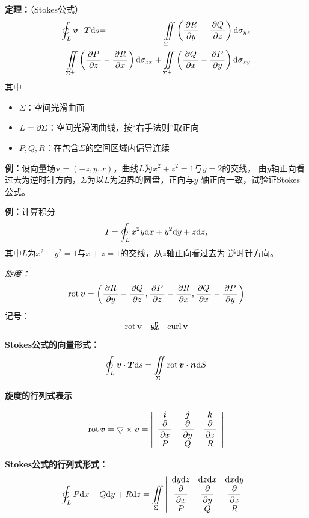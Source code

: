 {\bf 定理：}（Stokes公式）
\begin{eqnarray*}
	{\ds\oint_L\bm{v}\cdot\bm{T}\d s}&{=}&
	{\ds\iint\limits_{\Sigma^+}\left(\df{\p R}{\p y}-\df{\p Q}{\p
	z}\right)\d\sigma_{yz}}\\ 
	&& {\hspace{-2cm}\ds\iint\limits_{\Sigma^+}\left(\df{\p P}{\p
	z}-\df{\p R}{\p x}\right)\d\sigma_{zx}
	+\iint\limits_{\Sigma^+}\left(\df{\p Q}{\p x}-\df{\p P}{\p
	y}\right)\d\sigma_{xy}}
\end{eqnarray*}
其中
\begin{itemize}
  \item {$\Sigma$：}空间光滑曲面
  \item {$L=\partial\Sigma$：}空间光滑闭曲线，按{“右手法则”}取正向
  \item {$P,Q,R$：}在包含$\Sigma$的空间区域内偏导连续
\end{itemize}

{\bf 例：}设向量场$\bm{v}=(-z,y,x)$，曲线$L$为$x^2+z^2=1$与$y=2$的交线，
由$y$轴正向看过去为逆时针方向，$\Sigma$为以$L$为边界的圆盘，正向与$y$
轴正向一致，试验证Stokes公式。

{\bf 例：}计算积分
$$I=\oint_Lx^2y\mathrm{d} x+y^2\mathrm{d} y+z\mathrm{d} z,$$
其中$L$为$x^2+y^2=1$与$x+z=1$的交线，从$z$轴正向看过去为
逆时针方向。

{\it 旋度：}
$${\mathrm{rot}\,\bm{v}=\left(
\displaystyle\frac{\,{\partial R}\,}{\,{\partial y}\,}-\displaystyle\frac{\,{\partial Q}\,}{\,{\partial z}\,},
\displaystyle\frac{\,{\partial P}\,}{\,{\partial z}\,}-\displaystyle\frac{\,{\partial R}\,}{\,{\partial x}\,},
\displaystyle\frac{\,{\partial Q}\,}{\,{\partial x}\,}-\displaystyle\frac{\,{\partial P}\,}{\,{\partial y}\,}
\right)}$$ 
{记号：}
$$\mathrm{rot}\,\bm{v}\quad \mbox{或}\quad\mathrm{curl}\,\bm{v}$$ 

{\bf Stokes公式的向量形式：}
$${\oint_L\bm{v}\cdot\bm{T}\mathrm{d} s
=\iint\limits_{\Sigma}\mathrm{rot}\,\bm{v}\cdot\bm{n}\mathrm{d} S}$$

{\bf 旋度的行列式表示}

$${\mathrm{rot}\,\bm{v}=\bigtriangledown\times\bm{v} 
=\left|\begin{array}{ccc}
	\bm{i} & \bm{j} & \bm{k}\\
	\displaystyle\frac{\,{\partial}\,}{\,{\partial x}\,} & \displaystyle\frac{\,{\partial}\,}{\,{\partial y}\,} & \displaystyle\frac{\,{\partial}\,}{\,{\partial z}\,}\\
	P & Q & R
\end{array}\right|}$$ 

{\bf Stokes公式的行列式形式：} 
$${\oint_LP\mathrm{d} x+Q\mathrm{d} y+R\mathrm{d} z=\iint\limits_{\Sigma}
\left|\begin{array}{ccc}
	\mathrm{d} y\mathrm{d} z & \mathrm{d} z\mathrm{d} x & \mathrm{d} x\mathrm{d} y\\
	\displaystyle\frac{\,{\partial}\,}{\,{\partial x}\,} & \displaystyle\frac{\,{\partial}\,}{\,{\partial y}\,} & \displaystyle\frac{\,{\partial}\,}{\,{\partial z}\,}\\
	P & Q & R
\end{array}\right|}$$

